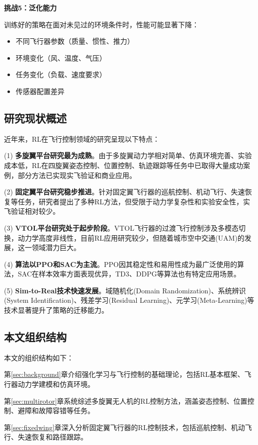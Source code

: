 \documentclass[12pt,a4paper]{ctexart}
\begin{document}
\textbf{挑战5：泛化能力}

训练好的策略在面对未见过的环境条件时，性能可能显著下降：
\begin{itemize}
    \item 不同飞行器参数（质量、惯性、推力）
    \item 环境变化（风、温度、气压）
    \item 任务变化（负载、速度要求）
    \item 传感器配置差异
\end{itemize}

\subsection{研究现状概述}

近年来，RL在飞行控制领域的研究呈现以下特点：

(1) \textbf{多旋翼平台研究最为成熟}。由于多旋翼动力学相对简单、仿真环境完善、实验成本低，RL在四旋翼姿态控制、位置控制、轨迹跟踪等任务中已取得大量成功案例，部分方法已实现实飞验证和商业应用。

(2) \textbf{固定翼平台研究稳步推进}。针对固定翼飞行器的巡航控制、机动飞行、失速恢复等任务，研究者提出了多种RL方法，但受限于动力学复杂性和实验安全性，实飞验证相对较少。

(3) \textbf{VTOL平台研究处于起步阶段}。VTOL飞行器的过渡飞行控制涉及多模态切换，动力学高度非线性，目前RL应用研究较少，但随着城市空中交通(UAM)的发展，这一领域潜力巨大。

(4) \textbf{算法以PPO和SAC为主流}。PPO因其稳定性和易用性成为最广泛使用的算法，SAC在样本效率方面表现优异，TD3、DDPG等算法也有特定应用场景。

(5) \textbf{Sim-to-Real技术快速发展}。域随机化(Domain Randomization)、系统辨识(System Identification)、残差学习(Residual Learning)、元学习(Meta-Learning)等技术显著提升了策略的迁移能力。

\subsection{本文组织结构}

本文的组织结构如下：

第\ref{sec:background}章介绍强化学习与飞行控制的基础理论，包括RL基本框架、飞行器动力学建模和仿真环境。

第\ref{sec:multirotor}章系统综述多旋翼无人机的RL控制方法，涵盖姿态控制、位置控制、避障和故障容错等任务。

第\ref{sec:fixedwing}章深入分析固定翼飞行器的RL控制技术，包括巡航控制、机动飞行、失速恢复和路径跟踪。
\end{document}
